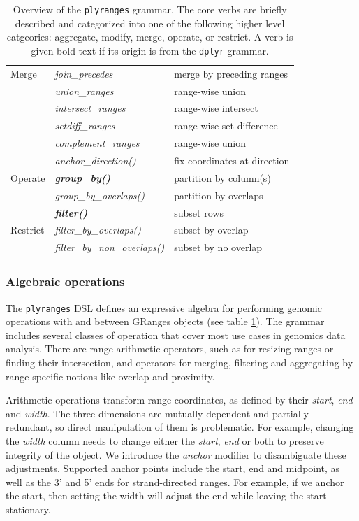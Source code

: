 \documentclass[]{article}
\begin{document}
\begin{table}[!htbp]
\begin{tabular}{|l|l|p{6cm}|}
    Merge & \emph{join\_precedes} & merge by preceding ranges \\
    & \emph{union\_ranges} & range-wise union \\
    & \emph{intersect\_ranges} & range-wise intersect \\
    & \emph{setdiff\_ranges} & range-wise set difference \\
    & \emph{complement\_ranges} & range-wise union \\
  \hline
   & \emph{anchor\_direction()} & fix coordinates at direction \\
  Operate & \textbf{\emph{group\_by()}} & partition by column(s)  \\ 
   & \emph{group\_by\_overlaps()} & partition by overlaps \\
   \hline
   & \textbf{\emph{filter()}} & subset rows \\
  Restrict & \emph{filter\_by\_overlaps()} & subset by overlap \\
    & \emph{filter\_by\_non\_overlaps()} & subset by no overlap \\
   \hline
\end{tabular}
\caption{Overview of the \texttt{plyranges} grammar. The core verbs are
briefly described and categorized into one of the following higher level 
catgeories: aggregate, modify, merge, operate, or restrict. A verb is given bold text if
its origin is from the \texttt{dplyr} grammar.}\label{tab:grammar}
\end{table}

\hypertarget{algebraic-operations}{%
\subsubsection{Algebraic operations}\label{algebraic-operations}}

The \texttt{plyranges} DSL defines an expressive algebra for performing
genomic operations with and between GRanges objects (see table
\ref{tab:grammar}). The grammar includes several classes of operation
that cover most use cases in genomics data analysis. There are range
arithmetic operators, such as for resizing ranges or finding their
intersection, and operators for merging, filtering and aggregating by
range-specific notions like overlap and proximity.

Arithmetic operations transform range coordinates, as defined by their
\emph{start}, \emph{end} and \emph{width}. The three dimensions are
mutually dependent and partially redundant, so direct manipulation of
them is problematic. For example, changing the \emph{width} column needs
to change either the \emph{start}, \emph{end} or both to preserve
integrity of the object. We introduce the \emph{anchor} modifier to
disambiguate these adjustments. Supported anchor points include the
start, end and midpoint, as well as the 3' and 5' ends for
strand-directed ranges. For example, if we anchor the start, then
setting the width will adjust the end while leaving the start
stationary.
\end{document}
